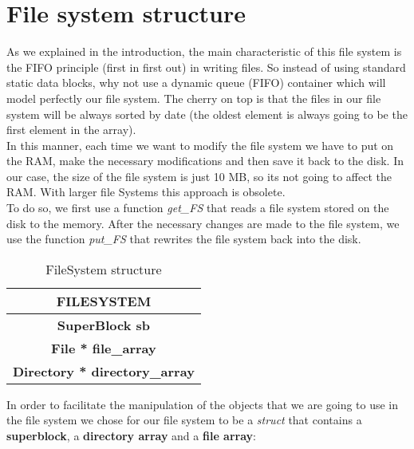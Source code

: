 \chapter{File system structure}
\label{cp:file system structure}
As we explained in the introduction, the main characteristic of this file system is the FIFO principle (first in first out) in writing files. So instead of using standard static data blocks, why not use a dynamic queue (FIFO) container which will model perfectly our file system. The cherry on top is that the files in our file system will be always sorted by date (the oldest element is always going to be the first element in the array).\\

In this manner, each time we want to modify the file system we have to put on the RAM, make the necessary modifications and then save it back to the disk. In our case, the size of the file system is just 10 MB, so its not going to affect the RAM. With larger file Systems this approach is obsolete.\\

To do so, we first use a function \textit{get\_FS} that reads a file system stored on the disk to the memory. After the necessary changes are made to the file system, we use the function \textit{put\_FS} that rewrites the file system back into the disk.\\

\begin{table}[hbt!]
    \centering
    \begin{tabular}{|c|}
        \hline
        \textbf{FILESYSTEM} \\
        \hline
        \textbf{SuperBlock sb} \\
        \hline
        \textbf{File * file\_array} \\
        \hline
        \textbf{Directory * directory\_array} \\
        \hline
    \end{tabular}
    \caption{FileSystem structure}
    \label{tab:my_label}
\end{table}

\newpage
In order to facilitate the manipulation of the objects that we are going to use in the file system we chose for our file system to be a \textit{struct} that contains a \textbf{superblock}, a \textbf{directory array} and a \textbf{file array}:

